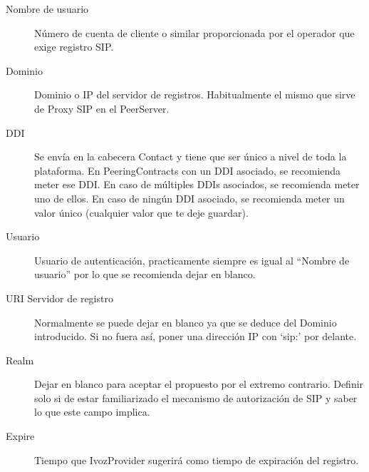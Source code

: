 \documentclass[letterpaper,10pt,spanish]{sphinxmanual}
\begin{document}
\noindent{}
\begin{description}
\item[{Nombre de usuario}] \leavevmode{}\label{external_incoming_calls/peering_contracts:term-nombre-de-usuario}
Número de cuenta de cliente o similar proporcionada por el operador que exige registro SIP.

\item[{Dominio}] \leavevmode{}\label{external_incoming_calls/peering_contracts:term-dominio}
Dominio o IP del servidor de registros. Habitualmente el mismo que sirve de Proxy SIP en el PeerServer.

\item[{DDI}] \leavevmode{}\label{external_incoming_calls/peering_contracts:term-ddi}
Se envía en la cabecera Contact y tiene que ser único a nivel de toda la plataforma. En PeeringContracts con un DDI asociado, se recomienda meter ese DDI. En caso de múltiples DDIs asociados, se recomienda meter uno de ellos. En caso de ningún DDI asociado, se recomienda meter un valor único (cualquier valor que te deje guardar).

\item[{Usuario}] \leavevmode{}\label{external_incoming_calls/peering_contracts:term-usuario}
Usuario de autenticación, practicamente siempre es igual al ``Nombre de usuario'' por lo que se recomienda dejar en blanco.

\item[{URI Servidor de registro}] \leavevmode{}\label{external_incoming_calls/peering_contracts:term-uri-servidor-de-registro}
Normalmente se puede dejar en blanco ya que se deduce del Dominio introducido. Si no fuera así, poner una dirección IP con `sip:' por delante.

\item[{Realm}] \leavevmode{}\label{external_incoming_calls/peering_contracts:term-realm}
Dejar en blanco para aceptar el propuesto por el extremo contrario. Definir solo si de estar familiarizado el mecanismo de autorización de SIP y saber lo que este campo implica.

\item[{Expire}] \leavevmode{}\label{external_incoming_calls/peering_contracts:term-expire}
Tiempo que IvozProvider sugerirá como tiempo de expiración del registro.

\end{description}
\end{document}
